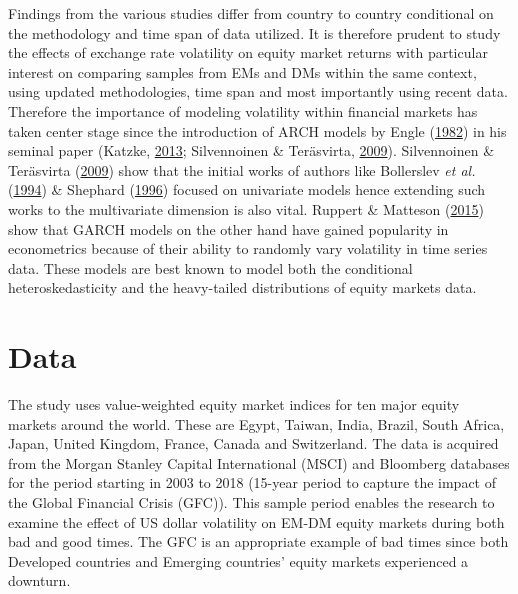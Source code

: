 \documentclass[11pt,preprint, authoryear]{elsarticle}
\numberwithin{equation}{section}
\numberwithin{figure}{section}
\numberwithin{table}{section}
\begin{document}
Findings from the various studies differ from country to country
conditional on the methodology and time span of data utilized. It is
therefore prudent to study the effects of exchange rate volatility on
equity market returns with particular interest on comparing samples from
EMs and DMs within the same context, using updated methodologies, time
span and most importantly using recent data. Therefore the importance of
modeling volatility within financial markets has taken center stage
since the introduction of ARCH models by Engle
(\protect\hyperlink{ref-engle1982}{1982}) in his seminal paper (Katzke,
\protect\hyperlink{ref-katzke2013}{2013}; Silvennoinen \& Teräsvirta,
\protect\hyperlink{ref-silvennoinen2009}{2009}). Silvennoinen \&
Teräsvirta (\protect\hyperlink{ref-silvennoinen2009}{2009}) show that
the initial works of authors like Bollerslev \emph{et al.}
(\protect\hyperlink{ref-bollerslev1994}{1994}) \& Shephard
(\protect\hyperlink{ref-shephard1996}{1996}) focused on univariate
models hence extending such works to the multivariate dimension is also
vital. Ruppert \& Matteson (\protect\hyperlink{ref-ruppert2015}{2015})
show that GARCH models on the other hand have gained popularity in
econometrics because of their ability to randomly vary volatility in
time series data. These models are best known to model both the
conditional heteroskedasticity and the heavy-tailed distributions of
equity markets data.

\hypertarget{data}{%
\section{\texorpdfstring{Data \label{Data}}{Data }}\label{data}}

The study uses value-weighted equity market indices for ten major equity
markets around the world. These are Egypt, Taiwan, India, Brazil, South
Africa, Japan, United Kingdom, France, Canada and Switzerland. The data
is acquired from the Morgan Stanley Capital International (MSCI) and
Bloomberg databases for the period starting in 2003 to 2018 (15-year
period to capture the impact of the Global Financial Crisis (GFC)). This
sample period enables the research to examine the effect of US dollar
volatility on EM-DM equity markets during both bad and good times. The
GFC is an appropriate example of bad times since both Developed
countries and Emerging countries' equity markets experienced a downturn.
\end{document}

